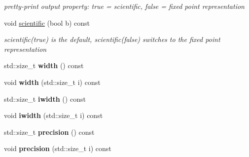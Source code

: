 \begin{DoxyCompactItemize}
\begin{DoxyCompactList}\small\item\em pretty-\/print output property: true = scientific, false = fixed point representation \item\end{DoxyCompactList}\item 
void \hyperlink{classhdnum_1_1Vector_ab9befaae588c670c4bc2a848d9072b97}{scientific} (bool b) const 
\begin{DoxyCompactList}\small\item\em scientific(true) is the default, scientific(false) switches to the fixed point representation \item\end{DoxyCompactList}\item 
\hypertarget{classhdnum_1_1Vector_a232022d5d9ff38b63c1495823875cec2}{
std::size\_\-t {\bfseries width} () const }
\label{classhdnum_1_1Vector_a232022d5d9ff38b63c1495823875cec2}

\item 
\hypertarget{classhdnum_1_1Vector_a78d2ee2c0096fbe9cbe5f8d1784e568c}{
void {\bfseries width} (std::size\_\-t i) const }
\label{classhdnum_1_1Vector_a78d2ee2c0096fbe9cbe5f8d1784e568c}

\item 
\hypertarget{classhdnum_1_1Vector_abf554eaf0a7ecc0bad0417283592f0a9}{
std::size\_\-t {\bfseries iwidth} () const }
\label{classhdnum_1_1Vector_abf554eaf0a7ecc0bad0417283592f0a9}

\item 
\hypertarget{classhdnum_1_1Vector_a27b91a95ee7395f755e67ea75536c379}{
void {\bfseries iwidth} (std::size\_\-t i) const }
\label{classhdnum_1_1Vector_a27b91a95ee7395f755e67ea75536c379}

\item 
\hypertarget{classhdnum_1_1Vector_a0c3b0743b35e145ef9943f919410f072}{
std::size\_\-t {\bfseries precision} () const }
\label{classhdnum_1_1Vector_a0c3b0743b35e145ef9943f919410f072}

\item 
\hypertarget{classhdnum_1_1Vector_a721b7c7def445694f44ee1fe6e25ca90}{
void {\bfseries precision} (std::size\_\-t i) const }
\label{classhdnum_1_1Vector_a721b7c7def445694f44ee1fe6e25ca90}

\end{DoxyCompactItemize}
